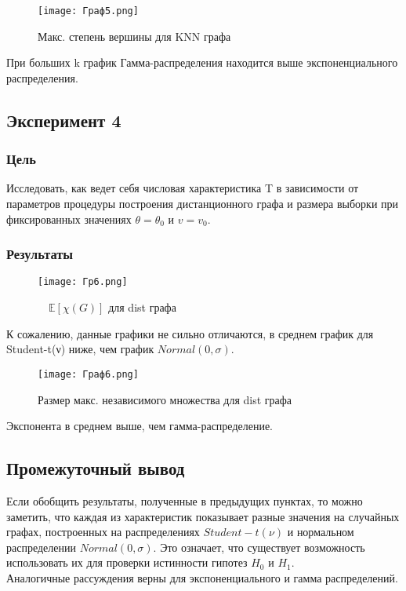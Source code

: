 \documentclass[a4paper, 12pt]{article}
\begin{document}
\begin{figure}[H]
    \centering
    \texttt{[image: Граф5.png]}
    \caption{Макс. степень вершины для KNN графа}
    \label{fig:uml}
\end{figure}

При больших k график Гамма-распределения находится выше экспоненциального распределения.

\subsection{Эксперимент 4}
\subsubsection{Цель}
Исследовать, как ведет себя числовая характеристика T в зависимости
от параметров процедуры построения дистанционного графа и размера выборки при
фиксированных значениях $\theta = \theta_0$ и $v = v_0$.\\
\subsubsection{Результаты}
\begin{figure}[H]
    \centering
    \texttt{[image: Гр6.png]}
    \caption{$\quad \mathbb{E}[\chi(G)]$ для dist графа}
    \label{fig:uml}
\end{figure}
К сожалению, данные графики не сильно отличаются, в среднем график для Student-t(ν) ниже, чем график $Normal(0,\sigma)$.

\begin{figure}[H]
    \centering
    \texttt{[image: Граф6.png]}
    \caption{Размер макс. независимого множества для dist графа}
    \label{fig:uml}
\end{figure}

Экспонента в среднем выше, чем гамма-распределение.

\subsection{Промежуточный вывод}
Если обобщить результаты, полученные в предыдущих пунктах, то можно заметить, что каждая из характеристик показывает разные значения на случайных графах, построенных на распределениях $Student-t(ν)$ и нормальном распределении $Normal(0,\sigma)$. Это означает, что существует возможность использовать их для проверки истинности гипотез $H_0$ и $H_1$.\\
Аналогичные рассуждения верны для экспоненциального и гамма распределений.
\end{document}
